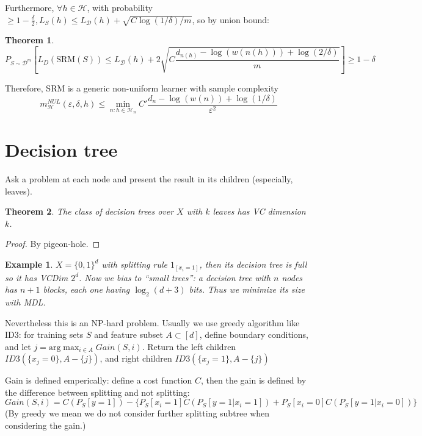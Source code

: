 \documentclass{book}
\renewcommand{\H}{\mathcal{H}}
\newcommand{\D}{\mathcal{D}}
\newtheorem{Thm}{Theorem}[section]
\newtheorem{Eg}{Example}[section]
\begin{document}
Furthermore, $\forall h\in\H$, with probability $\geq 1- \frac{\delta}{2}, L_S(h)\leq L_{\D}(h)+\sqrt{C\log(1/\delta)/m}$, so by union bound: 
\begin{Thm}
\begin{equation}
P_{S\sim \D^m}\left[ L_D(\mathrm{SRM}(S))\leq L_{\D}(h)+2 \sqrt{C \frac{d_{n(h)}-\log(w(n(h)))+\log(2/\delta)}{m}} \right]\geq 1-\delta
\end{equation}
\end{Thm}

Therefore, SRM is a generic non-uniform learner with sample complexity 
\begin{equation}
m_{\H}^{NUL}\left( \varepsilon,\delta,h \right)\leq \min_{n:h\in \H_n}C' \frac{d_n-\log(w(n))+\log(1/\delta)}{\varepsilon^2}
\end{equation}

\section{Decision tree}
Ask a problem at each node and present the result in its children (especially, leaves).

\begin{Thm}
  The class of decision trees over $X$ with $k$ leaves has VC dimension $k$.
\end{Thm}
\begin{proof}
  By pigeon-hole.
\end{proof}


\begin{Eg}
  $X=\{0,1\}^{d}$ with splitting rule $1_{[x_{i}=1]}$, then its decision tree is full so it has VCDim $2^{d}$. Now we bias to ``small trees'': a decision tree with $n$ nodes has $n+1$ blocks, each one having $\log_{2}(d+3)$ bits. Thus we minimize its size with MDL.
\end{Eg}

Nevertheless this is an NP-hard problem. Usually we use greedy algorithm like ID3: for training sets $S$ and feature subset $A\subset [d]$, define boundary conditions, and let $j=\mathrm{arg}\max_{i\in A}Gain (S,i)$. Return the left children $ID3(\{x_{j}=0\},A-\{j\})$, and right children $ID3(\{x_{j}=1\},A-\{j\})$

Gain is defined emperically: define a cost function $C$, then the gain is defined by the difference between splitting and not splitting:
\[Gain(S,i)=C(P_{S}[y=1])-\{P_{S}[x_{i}=1]C(P_{S}[y=1|x_{i}=1])+P_{S}[x_{i}=0]C(P_{S}[y=1|x_{i}=0])\}\]
(By greedy we mean we do not consider further splitting subtree when considering the gain.)
\end{document}
